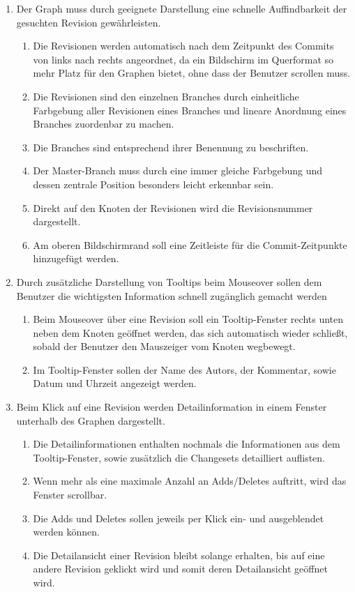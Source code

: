 \documentclass[nocolor]{tudbook}
\begin{document}
\begin{enumerate}[F1]
\item Der Graph muss durch geeignete Darstellung eine schnelle Auffindbarkeit der gesuchten Revision gewährleisten.
	\begin{enumerate}[{F1}.1]
	\item Die Revisionen werden automatisch nach dem Zeitpunkt des Commits von links nach rechts angeordnet, da ein Bildschirm im Querformat so mehr Platz für den Graphen bietet, ohne dass der Benutzer scrollen muss.
	\item Die Revisionen sind den einzelnen Branches durch einheitliche Farbgebung aller Revisionen eines Branches und lineare Anordnung eines Branches zuordenbar zu machen.
	\item Die Branches sind entsprechend ihrer Benennung zu beschriften.
	\item Der Master-Branch muss durch eine immer gleiche Farbgebung und dessen zentrale Position besonders leicht erkennbar sein.
	\item Direkt auf den Knoten der Revisionen wird die Revisionsnummer dargestellt.
	\item Am oberen Bildschirmrand soll eine Zeitleiste für die Commit-Zeitpunkte hinzugefügt werden.
	\end{enumerate}
\item Durch zusätzliche Darstellung von Tooltips beim Mouseover sollen dem Benutzer die wichtigsten Information schnell zugänglich gemacht werden
	\begin{enumerate}[{F2}.1]	
	\item Beim Mouseover über eine Revision soll ein Tooltip-Fenster rechts unten neben dem Knoten geöffnet werden, das sich automatisch wieder schließt, sobald der Benutzer den Mauszeiger vom Knoten wegbewegt.
	\item Im Tooltip-Fenster sollen der Name des Autors, der Kommentar, sowie Datum und Uhrzeit angezeigt werden.
	\end{enumerate}
\item Beim Klick auf eine Revision werden Detailinformation in einem Fenster unterhalb des Graphen dargestellt.
	\begin{enumerate}[{F3}.1]	
	\item Die Detailinformationen enthalten nochmals die Informationen aus dem Tooltip-Fenster, sowie zusätzlich die Changesets detailliert auflisten.
	\item Wenn mehr als eine maximale Anzahl an Adds/Deletes auftritt, wird das Fenster scrollbar.
	\item Die Adds und Deletes sollen jeweils per Klick ein- und ausgeblendet werden können.
	\item Die Detailansicht einer Revision bleibt solange erhalten, bis auf eine andere Revision geklickt wird und somit deren Detailansicht geöffnet wird.
	\end{enumerate}
\end{enumerate}
\end{document}
